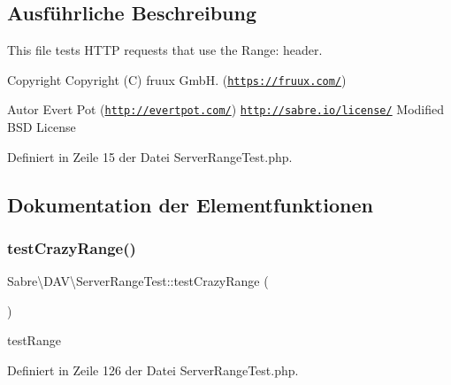 \subsection{Ausführliche Beschreibung}
This file tests H\+T\+TP requests that use the Range\+: header.

\begin{DoxyCopyright}{Copyright}
Copyright (C) fruux GmbH. (\href{https://fruux.com/}{\tt https\+://fruux.\+com/}) 
\end{DoxyCopyright}
\begin{DoxyAuthor}{Autor}
Evert Pot (\href{http://evertpot.com/}{\tt http\+://evertpot.\+com/})  \href{http://sabre.io/license/}{\tt http\+://sabre.\+io/license/} Modified B\+SD License 
\end{DoxyAuthor}


Definiert in Zeile 15 der Datei Server\+Range\+Test.\+php.



\subsection{Dokumentation der Elementfunktionen}
\mbox{\label{class_sabre_1_1_d_a_v_1_1_server_range_test_af27ed655b5eb3eb30a0b7b202a2c8400}} 
\subsubsection{\texorpdfstring{test\+Crazy\+Range()}{testCrazyRange()}}
{\footnotesize\ttfamily Sabre\textbackslash{}\+D\+A\+V\textbackslash{}\+Server\+Range\+Test\+::test\+Crazy\+Range (\begin{DoxyParamCaption}{ }\end{DoxyParamCaption})}

test\+Range 

Definiert in Zeile 126 der Datei Server\+Range\+Test.\+php.

\mbox{\label{class_sabre_1_1_d_a_v_1_1_server_range_test_a65f7ca1baf32af79031d0f82f09d83e7}} 
